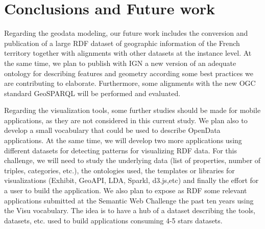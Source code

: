 \documentclass[a4paper,11pt]{report}
\begin{document}

\chapter*{Conclusions and Future work}
Regarding the geodata modeling, our future work includes the conversion and publication of a large RDF dataset of geographic information of the French territory together with alignments with other datasets at the instance level. At the same time, we plan to publish with IGN a new version of an adequate ontology for describing features and geometry according some best practices we are contributing to elaborate. Furthermore, some alignments with the new OGC standard GeoSPARQL will be performed and evaluated.

Regarding the visualization tools, some further studies should be made for mobile applications, as they are not considered in this current study. We plan also to develop a small vocabulary that could be used to describe OpenData applications. At the same time, we will develop two more applications using different datasets for detecting patterns for visualizing RDF data. For this challenge, we will need to study the underlying data (list of properties, number of triples, categories, etc.), the ontologies used, the templates or libraries for visualizations (Exhibit, GeoAPI, LDA, Sparkl, d3.js,etc) and finally the effort for a user to build the application.
We also plan to expose as RDF some relevant applications submitted at the Semantic Web Challenge the past ten years using the Visu vocabulary. The idea is to have a hub of a dataset describing the tools, datasets, etc.  used to build  applications consuming 4-5 stars datasets.

{}
\nocite{*}


{}


\end{document}
